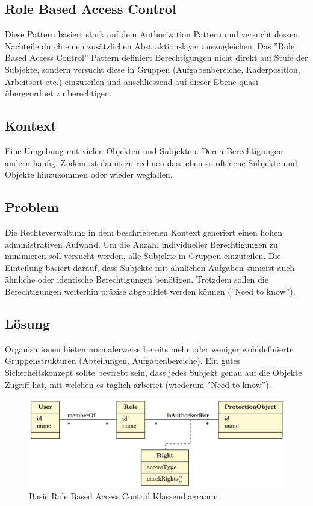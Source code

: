 \subsection{Role Based Access Control}
\label{sec:rbac}

Diese Pattern basiert stark auf dem Authorization Pattern und versucht dessen Nachteile durch einen zusätzlichen Abstraktionslayer auszugleichen.
Das ''Role Based Access Control'' Pattern definiert Berechtigungen nicht direkt auf Stufe der Subjekte, sondern versucht diese in Gruppen (Aufgabenbereiche, Kaderposition, Arbeitsort etc.) einzuteilen und anschliessend auf dieser Ebene quasi übergeordnet zu berechtigen.

\subsection*{Kontext}
Eine Umgebung mit vielen Objekten und Subjekten. Deren Berechtigungen ändern häufig. Zudem ist damit zu rechnen dass eben so oft neue Subjekte und Objekte hinzukommen oder wieder wegfallen.

\subsection*{Problem}
Die Rechteverwaltung in dem beschriebenen Kontext generiert einen hohen administrativen Aufwand. Um die Anzahl individueller Berechtigungen zu minimieren soll versucht werden, alle Subjekte in Gruppen einzuteilen. Die Einteilung basiert darauf, dass Subjekte mit ähnlichen Aufgaben zumeist auch ähnliche oder identische Berechtigungen benötigen.
Trotzdem sollen die Berechtigungen weiterhin präzise abgebildet werden können (''Need to know'').

\subsection*{Lösung}
Organisationen bieten normalerweise bereits mehr oder weniger wohldefinierte Gruppenstrukturen (Abteilungen, Aufgabenbereiche).
Ein gutes Sicherheitskonzept sollte bestrebt sein, dass jedes Subjekt genau auf die Objekte Zugriff hat, mit welchen es täglich arbeitet (wiederum ''Need to know'').

\begin{figure}[H]
	\includegraphics[width=\textwidth]{content/security/accesscontrolmodels/images/rolebasedaccesscontrol.png}
	\caption{Basic Role Based Access Control Klassendiagramm}
\end{figure}

